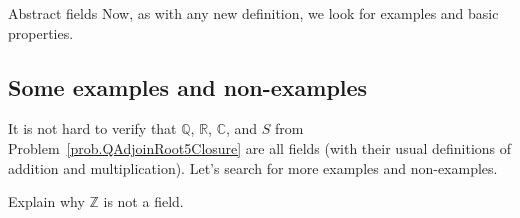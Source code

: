 \begin{section}{Abstract fields}
Now, as with any new definition, we look for examples and basic properties.

\subsection{Some examples and non-examples}

It is not hard to verify that $\mathbb{Q}$, $\mathbb{R}$, $\mathbb{C}$, and $S$ from Problem~\ref{prob.QAdjoinRoot5Closure} are all fields (with their usual definitions of addition and multiplication). Let's search for more examples and non-examples.

\begin{problem}
Explain why $\mathbb{Z}$ is not a field.
\end{problem}


\end{section}
